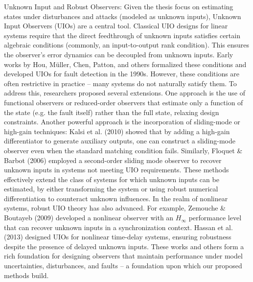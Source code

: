 Unknown Input and Robust Observers: Given the thesis focus on estimating states under disturbances and attacks (modeled as unknown inputs), Unknown Input Observers (UIOs) are a central tool. Classical UIO designs for linear systems require that the direct feedthrough of unknown inputs satisfies certain algebraic conditions (commonly, an input-to-output rank condition). This ensures the observer’s error dynamics can be decoupled from unknown inputs. Early works by Hou, Müller, Chen, Patton, and others formalized these conditions and developed UIOs for fault detection in the 1990s. However, these conditions are often restrictive in practice – many systems do not naturally satisfy them. To address this, researchers proposed several extensions. One approach is the use of functional observers or reduced-order observers that estimate only a function of the state (e.g. the fault itself) rather than the full state, relaxing design constraints. Another powerful approach is the incorporation of sliding-mode or high-gain techniques: Kalsi et al. (2010) showed that by adding a high-gain differentiator to generate auxiliary outputs, one can construct a sliding-mode observer even when the standard matching condition fails. Similarly, Floquet \& Barbot (2006) employed a second-order sliding mode observer to recover unknown inputs in systems not meeting UIO requirements. These methods effectively extend the class of systems for which unknown inputs can be estimated, by either transforming the system or using robust numerical differentiation to counteract unknown influences. In the realm of nonlinear systems, robust UIO theory has also advanced. For example, Zemouche \& Boutayeb (2009) developed a nonlinear observer with an $H_\infty$ performance level that can recover unknown inputs in a synchronization context. Hassan et al. (2013) designed UIOs for nonlinear time-delay systems, ensuring robustness despite the presence of delayed unknown inputs. These works and others form a rich foundation for designing observers that maintain performance under model uncertainties, disturbances, and faults – a foundation upon which our proposed methods build.

